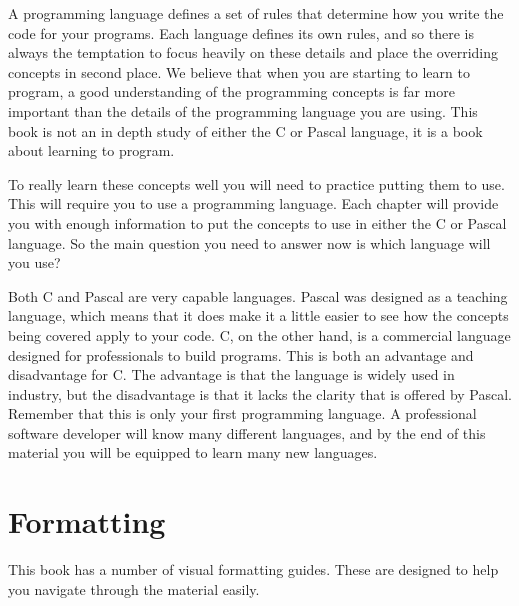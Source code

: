 A programming language defines a set of rules that determine how you write the code for your programs. Each language defines its own rules, and so there is always the temptation to focus heavily on these details and place the overriding concepts in second place. We believe that when you are starting to learn to program, a good understanding of the programming concepts is far more important than the details of the programming language you are using. This book is not an in depth study of either the C or Pascal language, it is a book about learning to program.

To really learn these concepts well you will need to practice putting them to use. This will require you to use a programming language. Each chapter will provide you with enough information to put the concepts to use in either the C or Pascal language. So the main question you need to answer now is which language will you use?

Both C and Pascal are very capable languages. Pascal was designed as a teaching language, which means that it does make it a little easier to see how the concepts being covered apply to your code. C, on the other hand, is a commercial language designed for professionals to build programs. This is both an advantage and disadvantage for C. The advantage is that the language is widely used in industry, but the disadvantage is that it lacks the clarity that is offered by Pascal. Remember that this is only your first programming language. A professional software developer will know many different languages, and by the end of this material you will be equipped to learn many new languages.




\clearpage
\section*{Formatting} %
\label{sub:formatting}

This book has a number of visual formatting guides. These are designed to help you navigate through the material easily.



